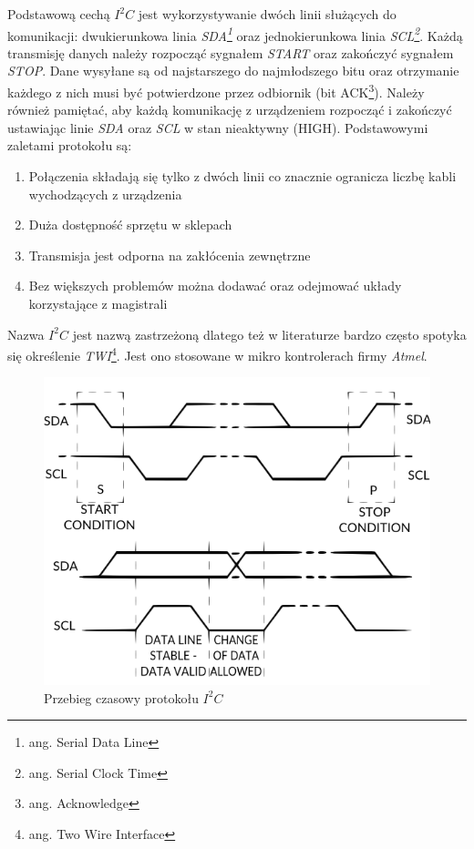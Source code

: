 \documentclass{xmgr}
\begin{document}
Podstawową cechą \emph{$I^2C$} jest wykorzystywanie dwóch linii służących do komunikacji: dwukierunkowa linia \emph{SDA\footnote{ang. Serial Data Line}} oraz jednokierunkowa linia \emph{SCL\footnote{ang. Serial Clock Time}}. Każdą transmisję danych należy rozpocząć sygnałem \emph{START} oraz zakończyć sygnałem \emph{STOP}. Dane wysyłane są od najstarszego do najmłodszego bitu oraz otrzymanie każdego z nich musi być potwierdzone przez odbiornik (bit ACK\footnote{ang. Acknowledge}). Należy również pamiętać, aby każdą komunikację z urządzeniem rozpocząć i zakończyć ustawiając linie \emph{SDA} oraz \emph{SCL} w stan nieaktywny (HIGH). Podstawowymi zaletami protokołu są:
\begin{enumerate}
	\item Połączenia składają się tylko z dwóch linii co znacznie ogranicza liczbę kabli wychodzących z urządzenia
	\item Duża dostępność sprzętu w sklepach
	\item Transmisja jest odporna na zakłócenia zewnętrzne
	\item Bez większych problemów można dodawać oraz odejmować układy korzystające z magistrali
\end{enumerate}

Nazwa $I^2C$ jest nazwą zastrzeżoną dlatego też w literaturze bardzo często spotyka się określenie \emph{TWI}\footnote{ang. Two Wire Interface}. Jest ono stosowane w mikro kontrolerach firmy \emph{Atmel}. 

\begin{figure}[!h]
    \centering
    \includegraphics[height=0.3\textheight]{images/i2c.png}
    \caption{Przebieg czasowy protokołu $I^2C$}
\end{figure}
\end{document}
